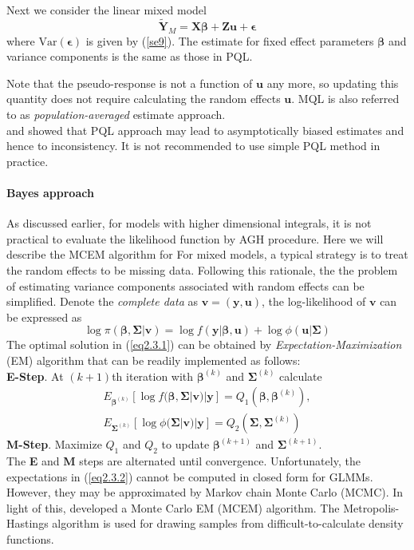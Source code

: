 		Next we consider the linear mixed model 
		\[ \tilde{\bm Y}_M  = \bm {X\beta}+ \bm {Zu}  + \bm \epsilon\] 
		where $\text{Var}(\bm \epsilon) $ is given by (\ref{se9}).  The estimate for fixed effect parameters $\bm \beta$ and variance components is the same as those in PQL. 
		
		Note that the pseudo-response is not a function of $\bm u$ any more, so updating this quantity does not require calculating the random effects $\bm u$. MQL is also referred to as \textit{population-averaged} estimate approach. \\
		
		\cite{pinheiro2006efficient} and \cite{breslow1995bias} showed that PQL approach may lead to asymptotically biased estimates and hence to inconsistency. It is not recommended to use simple PQL method in practice. 
		
		
		\paragraph{Bayes approach}
		As discussed earlier, for models with higher dimensional integrals, it is not practical to evaluate the likelihood function by AGH procedure. 
		Here we will describe the MCEM algorithm for 
		For mixed models, a typical strategy is to treat the random effects to be missing data. Following this rationale, the the problem of estimating variance components associated with random effects can be simplified. Denote the \textit{complete data} as $\bm v = (\bm y, \bm u)$, the log-likelihood of $\bm v$ can be expressed as 
		\begin{equation}\label{eq2.3.1}
		\log \pi(\bm \beta , \bm \Sigma|\bm v) = \log f(\bm y|\bm \beta, \bm u) + \log \phi(\bm u|\bm \Sigma)
		\end{equation}  
		The optimal solution in (\ref{eq2.3.1}) can be obtained by \textit{Expectation-Maximization} (EM) algorithm that can be readily implemented as follows:\\
		\textbf{E-Step}. At $(k+1)$th iteration with $\bm \beta^{(k)}$ and $\bm\Sigma^{(k)}$   calculate 
		\begin{equation}\label{eq2.3.2}
		\begin{aligned}
		E_{\bm \beta^{(k)}}[\log f(\bm \beta , \bm \Sigma|\bm v)|\bm y]= Q_1(\bm \beta, \bm \beta^{(k)}), \\
		E_{\bm \Sigma^{(k)}}[\log \phi(\bm \Sigma|\bm v)|\bm y]= Q_2(\bm \Sigma, \bm \Sigma^{(k)})
		\end{aligned}
		\end{equation}
		\textbf{M-Step}.  Maximize $Q_1$ and $Q_2$ to update  $\bm \beta^{(k+1)}$ and $\bm\Sigma^{(k+1)}$. \\
		The \textbf{E} and \textbf{M} steps are alternated until convergence. Unfortunately, the expectations in (\ref{eq2.3.2}) cannot be computed in closed form for GLMMs. However, they may be approximated by Markov chain Monte Carlo (MCMC). In light of this, \cite{mcculloch1997maximum} developed a Monte Carlo EM (MCEM) algorithm. The Metropolis-Hastings algorithm is used for drawing samples from difficult-to-calculate density functions. \\
		
